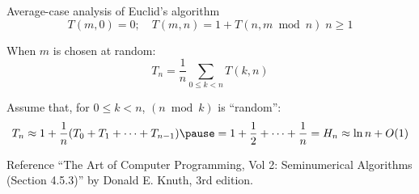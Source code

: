\begin{frame}{Average-case analysis of Euclid's algorithm}
  \[
	T(m,0) = 0; \quad T(m,n) = 1 + T(n, m \bmod n) \; n \ge 1
  \]
  
  When $m$ is chosen at random:
  \[
	T_n = \frac{1}{n} \sum_{0 \le k < n} T(k,n)
  \]

  Assume that, for $0 \le k < n$, $(n \bmod k)$ is ``random'':
  \[
	T_n \approx 1 + \frac{1}{n} (T_0 + T_1 + \cdots + T_{n-1}) \pause = 1 + \frac{1}{2} + \cdots + \frac{1}{n} = H_n \approx \ln n + O(1)
  \]

  \pause
  \begin{alertblock}{Reference}
	``The Art of Computer Programming, Vol 2: Seminumerical Algorithms (Section 4.5.3)'' by Donald E. Knuth, 3rd edition.
  \end{alertblock}
\end{frame}

